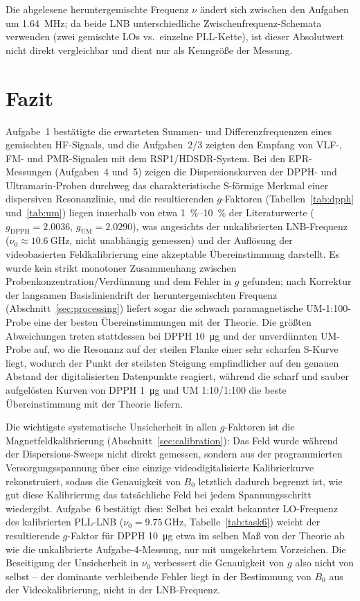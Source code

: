\documentclass[11pt,a4paper]{article}
\begin{document}
Die abgelesene heruntergemischte Frequenz $\nu$ ändert sich zwischen den
Aufgaben um \SI{+1.64}{\mega\hertz}; da beide LNB unterschiedliche
Zwischenfrequenz-Schemata verwenden (zwei gemischte LOs vs.\ einzelne
PLL-Kette), ist dieser Absolutwert nicht direkt vergleichbar und dient nur als
Kenngröße der Messung.

\section{Fazit}
Aufgabe~1 bestätigte die erwarteten Summen- und Differenzfrequenzen eines
gemischten HF-Signals, und die Aufgaben~2/3 zeigten den Empfang von VLF-,
FM- und PMR-Signalen mit dem RSP1/HDSDR-System. Bei den EPR-Messungen
(Aufgaben~4 und~5) zeigen die Dispersionskurven der DPPH- und
Ultramarin-Proben durchweg das charakteristische S-förmige Merkmal einer
dispersiven Resonanzlinie, und die resultierenden $g$-Faktoren
(Tabellen~\ref{tab:dpph} und~\ref{tab:um}) liegen innerhalb von etwa
\SIrange{1}{10}{\percent} der Literaturwerte ($g_{\text{DPPH}} = 2.0036$,
$g_{\text{UM}} = 2.0290$), was angesichts der unkalibrierten LNB-Frequenz
($\nu_0 \approx \SI{10.6}{\giga\hertz}$, nicht unabhängig gemessen) und der
Auflösung der videobasierten Feldkalibrierung eine akzeptable Übereinstimmung
darstellt. Es wurde kein strikt monotoner Zusammenhang zwischen
Probenkonzentration/Verdünnung und dem Fehler in $g$ gefunden; nach
Korrektur der langsamen Basisliniendrift der heruntergemischten Frequenz
(Abschnitt~\ref{sec:processing}) liefert sogar die schwach paramagnetische
UM-1:100-Probe eine der besten Übereinstimmungen mit der Theorie. Die
größten Abweichungen treten stattdessen bei DPPH \SI{10}{\micro\gram} und
der unverdünnten UM-Probe auf, wo die Resonanz auf der steilen Flanke einer
sehr scharfen S-Kurve liegt, wodurch der Punkt der steilsten Steigung
empfindlicher auf den genauen Abstand der digitalisierten Datenpunkte reagiert, während die scharf und
sauber aufgelösten Kurven von DPPH \SI{1}{\micro\gram} und UM 1:10/1:100 die
beste Übereinstimmung mit der Theorie liefern.

Die wichtigste systematische Unsicherheit in allen $g$-Faktoren ist die
Magnetfeldkalibrierung (Abschnitt~\ref{sec:calibration}): Das Feld wurde
während der Dispersions-Sweeps nicht direkt gemessen, sondern aus der
programmierten Versorgungsspannung über eine einzige videodigitalisierte
Kalibrierkurve rekonstruiert, sodass die Genauigkeit von $B_0$ letztlich
dadurch begrenzt ist, wie gut diese Kalibrierung das tatsächliche Feld bei
jedem Spannungsschritt wiedergibt. Aufgabe~6 bestätigt dies: Selbst bei
exakt bekannter LO-Frequenz des kalibrierten PLL-LNB
($\nu_0 = \SI{9.75}{\giga\hertz}$, Tabelle~\ref{tab:task6}) weicht der
resultierende $g$-Faktor für DPPH \SI{10}{\micro\gram} etwa im selben Maß
von der Theorie ab wie die unkalibrierte Aufgabe-4-Messung, nur mit
umgekehrtem Vorzeichen. Die Beseitigung der Unsicherheit in $\nu_0$
verbessert die Genauigkeit von $g$ also nicht von selbst -- der dominante
verbleibende Fehler liegt in der Bestimmung von $B_0$ aus der
Videokalibrierung, nicht in der LNB-Frequenz.
\end{document}
